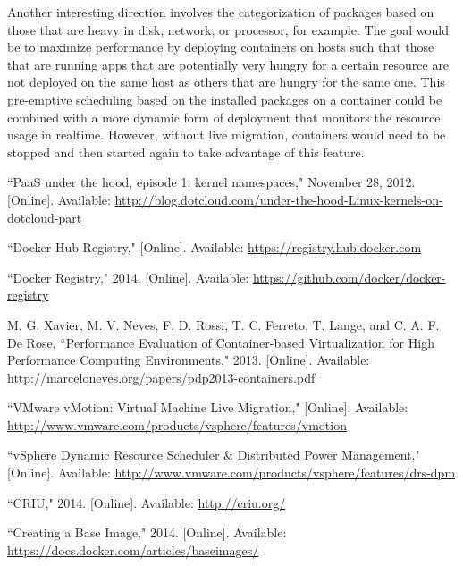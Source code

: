\documentclass[\myfontsize, letterpaper]{article}
\begin{document}
Another interesting direction involves the categorization of packages based on those that are heavy in disk, network, or processor, for example. The goal would be to maximize performance by deploying containers on hosts such that those that are running apps that are potentially very hungry for a certain resource are not deployed on the same host as others that are hungry for the same one. This pre-emptive scheduling based on the installed packages on a container could be combined with a more dynamic form of deployment that monitors the resource usage in realtime. However, without live migration, containers would need to be stopped and then started again to take advantage of this feature.

\begin{thebibliography}{99}

``PaaS under the hood, episode 1: kernel namespaces," November 28, 2012. [Online]. Available: \href{http://blog.dotcloud.com/under-the-hood-Linux-kernels-on-dotcloud-part}{http://blog.dotcloud.com/under-the-hood-Linux-kernels-on-dotcloud-part}

``Docker Hub Registry," [Online]. Available: \href{https://registry.hub.docker.com}{https://registry.hub.docker.com}

``Docker Registry," 2014. [Online]. Available: \href{https://github.com/docker/docker-registry}{https://github.com/docker/docker-registry}

M. G. Xavier, M. V. Neves, F. D. Rossi, T. C. Ferreto, T. Lange, and C. A. F. De Rose, ``Performance Evaluation of Container-based Virtualization for High Performance Computing Environments," 2013. [Online]. Available: \href{http://marceloneves.org/papers/pdp2013-containers.pdf}{http://marceloneves.org/papers/pdp2013-containers.pdf}

``VMware vMotion: Virtual Machine Live Migration," [Online]. Available: \href{http://www.vmware.com/products/vsphere/features/vmotion}{http://www.vmware.com/products/vsphere/features/vmotion}

``vSphere Dynamic Resource Scheduler & Distributed Power Management," [Online]. Available: \href{http://www.vmware.com/products/vsphere/features/drs-dpm}{http://www.vmware.com/products/vsphere/features/drs-dpm}

``CRIU," 2014. [Online]. Available: \href{http://criu.org/}{http://criu.org/}

``Creating a Base Image," 2014. [Online]. Available: \href{https://docs.docker.com/articles/baseimages/}{https://docs.docker.com/articles/baseimages/}


\end{thebibliography}
\end{document}
